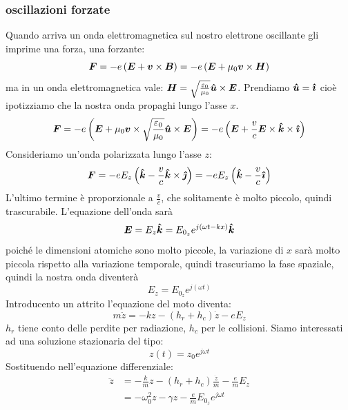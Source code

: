\subsubsection{oscillazioni forzate}
Quando arriva un onda elettromagnetica sul nostro elettrone oscillante gli imprime una forza, una forzante:
\begin{equation}
  \boldsymbol{F}=-e\left(\boldsymbol{E}+\boldsymbol{v}\times\boldsymbol{B}\right)=-e\left(\boldsymbol{E}+\mu_0\boldsymbol{v}\times\boldsymbol{H}\right)
\end{equation}
ma in un onda elettromagnetica vale: $\boldsymbol{H}=\sqrt{\frac{\varepsilon_0}{\mu_0}}\boldsymbol{\hat {u}}\times \boldsymbol{E}$. Prendiamo $\boldsymbol{\hat {u}}=\boldsymbol{\hat {\imath}}$ cioè ipotizziamo che la nostra onda propaghi lungo l'asse $x$.
\begin{equation}
  \boldsymbol{F}=-e\left(\boldsymbol{E}+\mu_0\boldsymbol{v}\times \sqrt{\frac{\varepsilon_0}{\mu_0}}\boldsymbol{\hat {u}}\times \boldsymbol{E}\right)=-e\left(\boldsymbol{E}+\frac{v}{c}\boldsymbol{E}\times\boldsymbol{\hat {k}}\times \boldsymbol{\hat {\imath}}\right)
\end{equation}
Consideriamo un'onda polarizzata lungo l'asse $z$:
\begin{equation}
  \boldsymbol{F}=-eE_z\left(\boldsymbol{\hat {k}}-\frac{v}{c}\boldsymbol{\hat {k}}\times\boldsymbol{\hat {\jmath}}\right)=-eE_z\left(\boldsymbol{\hat {k}}-\frac{v}{c}\boldsymbol{\hat {\imath}}\right)
\end{equation}
L'ultimo termine è proporzionale a $\frac{v}{c}$, che solitamente è molto piccolo, quindi trascurabile. L'equazione dell'onda sarà \begin{equation}
  \boldsymbol{E}=E_z\boldsymbol{\hat {k}}=E_{0_z}e^{j\left(\omega t-kx\right)}\boldsymbol{\hat {k}}
\end{equation}
poiché le dimensioni atomiche sono molto piccole, la variazione di $x$ sarà molto piccola rispetto alla variazione temporale, quindi trascuriamo la fase spaziale, quindi la nostra onda diventerà
\begin{equation}
  E_z=E_{0_z}e^{j\left(\omega t\right)}
\end{equation}
Introducento un attrito l'equazione del moto diventa:
\begin{equation}
  m\ddot z=-kz-\left(h_r+h_c\right)\dot z-eE_z
\end{equation}
$h_r$ tiene conto delle perdite per radiazione, $h_c$ per le collisioni. Siamo interessati ad una soluzione stazionaria del tipo:
\begin{equation}
  z(t)=z_0e^{j\omega t}
\end{equation}
Sostituendo nell'equazione differenziale:
\[
  \begin{split}
    \ddot z&=-\frac{k}{m}z-(h_r+h_c)\frac{\dot z}{m}-\frac{e}{m}E_z\\
    &=-\omega_0^2z-\gamma z-\frac{e}{m}E_{0_z}e^{j\omega t}\\
  \end{split}
\]
